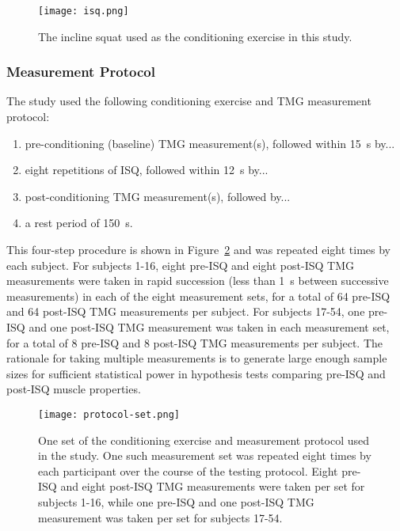\documentclass[utf8]{FrontiersinHarvard}
\begin{document}
\begin{figure}
	\centering
    \texttt{[image: isq.png]}
    \caption{The incline squat used as the conditioning exercise in this study.}
    \label{fig:isq}
\end{figure}

\subsubsection{Measurement Protocol} \label{sss:measurement_protocol}
The study used the following conditioning exercise and TMG measurement protocol:
\begin{enumerate}

    \item pre-conditioning (baseline) TMG measurement(s), followed within \SI{15}{\second} by...

    \item eight repetitions of ISQ, followed within \SI{12}{\second} by...

    \item post-conditioning TMG measurement(s), followed by...

    \item a rest period of \SI{150}{\second}.

\end{enumerate}
This four-step procedure is shown in Figure~\ref{fig:protocol} and was repeated eight times by each subject.
For subjects 1-16, eight pre-ISQ and eight post-ISQ TMG measurements were taken in rapid succession (less than \SI{1}{\second} between successive measurements) in each of the eight measurement sets, for a total of 64 pre-ISQ and 64 post-ISQ TMG measurements per subject.
For subjects 17-54, one pre-ISQ and one post-ISQ TMG measurement was taken in each measurement set, for a total of 8 pre-ISQ and 8 post-ISQ TMG measurements per subject.
The rationale for taking multiple measurements is to generate large enough sample sizes for sufficient statistical power in hypothesis tests comparing pre-ISQ and post-ISQ muscle properties.

\begin{figure}
	\centering
    \texttt{[image: protocol-set.png]}
    \caption{One set of the conditioning exercise and measurement protocol used in the study.
    One such measurement set was repeated eight times by each participant over the course of the testing protocol.
    Eight pre-ISQ and eight post-ISQ TMG measurements were taken per set for subjects 1-16, while one pre-ISQ and one post-ISQ TMG measurement was taken per set for subjects 17-54.}
    \label{fig:protocol}
\end{figure}
\end{document}
